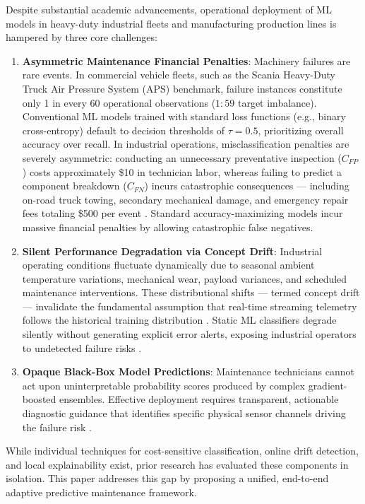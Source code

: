 \documentclass[journal]{IEEEtran}
\begin{document}
Despite substantial academic advancements, operational deployment of ML models in heavy-duty industrial fleets and manufacturing production lines is hampered by three core challenges:

\begin{enumerate}
    \item \textbf{Asymmetric Maintenance Financial Penalties}: Machinery failures are rare events. In commercial vehicle fleets, such as the Scania Heavy-Duty Truck Air Pressure System (APS) benchmark, failure instances constitute only 1 in every 60 operational observations ($1:59$ target imbalance). Conventional ML models trained with standard loss functions (e.g., binary cross-entropy) default to decision thresholds of $\tau = 0.5$, prioritizing overall accuracy over recall. In industrial operations, misclassification penalties are severely asymmetric: conducting an unnecessary preventative inspection ($C_{FP}$) costs approximately \$10 in technician labor, whereas failing to predict a component breakdown ($C_{FN}$) incurs catastrophic consequences --- including on-road truck towing, secondary mechanical damage, and emergency repair fees totaling \$500 per event \cite{akarte2018}. Standard accuracy-maximizing models incur massive financial penalties by allowing catastrophic false negatives.
    \item \textbf{Silent Performance Degradation via Concept Drift}: Industrial operating conditions fluctuate dynamically due to seasonal ambient temperature variations, mechanical wear, payload variances, and scheduled maintenance interventions. These distributional shifts --- termed concept drift --- invalidate the fundamental assumption that real-time streaming telemetry follows the historical training distribution \cite{lu2019}. Static ML classifiers degrade silently without generating explicit error alerts, exposing industrial operators to undetected failure risks \cite{tzelepis2025}.
    \item \textbf{Opaque Black-Box Model Predictions}: Maintenance technicians cannot act upon uninterpretable probability scores produced by complex gradient-boosted ensembles. Effective deployment requires transparent, actionable diagnostic guidance that identifies specific physical sensor channels driving the failure risk \cite{mothilal2020}.
\end{enumerate}

While individual techniques for cost-sensitive classification, online drift detection, and local explainability exist, prior research has evaluated these components in isolation. This paper addresses this gap by proposing a unified, end-to-end adaptive predictive maintenance framework.
\end{document}
